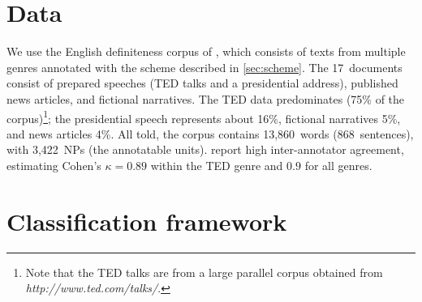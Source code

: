 \documentclass[11pt,letterpaper]{article}
\begin{document}
\section{Data}\label{sec:data}

We use the English definiteness corpus of \citet{bhatia14}, 
which consists of texts from multiple genres annotated with the scheme described in \cref{sec:scheme}. 
The 17~documents consist of prepared speeches (TED talks and a presidential address), 
published news articles, and fictional narratives. 
The TED data predominates (75\% of the corpus)\footnote{Note that the TED talks are from a large parallel corpus obtained from {\it http://www.ted.com/talks/}.}; 
the presidential speech represents about 16\%, fictional narratives 5\%, and news articles 4\%. 
All told, the corpus contains 13,860~words (868~sentences), with 3,422~NPs (the annotatable units). 
\citet{bhatia14} report high inter-annotator agreement, estimating Cohen's $\kappa = 0.89$ within the TED genre 
and $0.9$ for all genres.  


\section{Classification framework}\label{sec:modeling}
\end{document}
